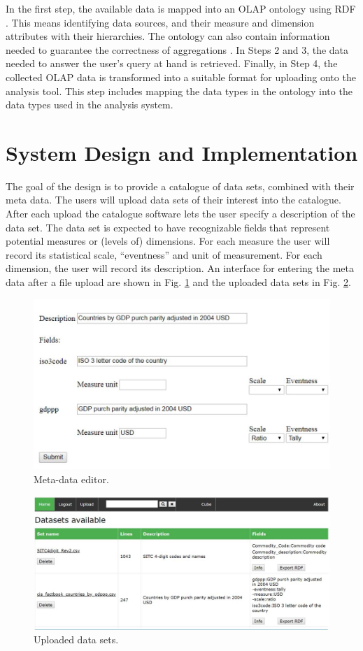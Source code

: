 \documentclass[USenglish,twocolumn]{article}
\begin{document}
In the first step, the available data is mapped into an OLAP ontology
using RDF \cite{Nie07}. This means identifying data sources, and their measure and
dimension attributes with their hierarchies. The ontology can also
contain information needed to guarantee the correctness of aggregations \cite{Tap14}.
In Steps 2 and 3, the data needed to answer the user's query at hand
is retrieved. Finally, in Step 4, the collected OLAP data is transformed
into a suitable format for uploading onto the analysis tool. This step
includes mapping the data types in the ontology into the data types used
in the analysis system.


\section{System Design and Implementation}

The goal of the design is to
provide a catalogue of data sets, combined with their meta data. The
users will upload data sets of their interest into the catalogue. After
each upload the catalogue software lets the user specify a description
of the data set. The data set is expected to have recognizable fields
that represent potential measures or (levels of) dimensions. For each
measure the user will record its statistical scale, ``eventness'' and
unit of measurement. For each dimension, the user will record its
description. An interface for entering the meta data after a file upload
are shown in Fig. \ref{fig2} and the uploaded data sets in Fig. \ref{fig3}.

\begin{figure}
\includegraphics[scale=0.3]{fig2.JPG}
\caption{Meta-data editor.\label{fig2}}
\end{figure}

\begin{figure}
\includegraphics[scale=0.3]{fig3.JPG}
\caption{Uploaded data sets.\label{fig3}}
\end{figure}
\end{document}
